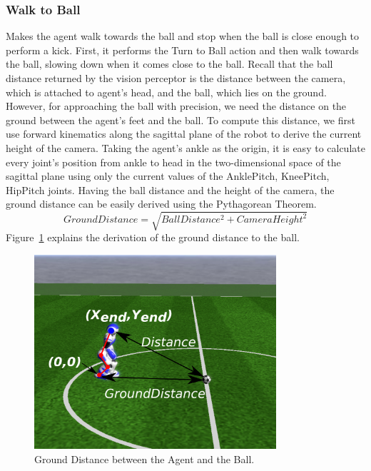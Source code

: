 \subsubsection*{Walk to Ball}
Makes the agent walk towards the ball and stop when the ball is close enough to perform a kick. First, it performs the Turn to Ball action and then walk towards the ball, slowing down when it comes close to the ball. Recall that the ball distance returned by the vision perceptor is the distance between the camera, which is attached to agent's head, and the ball, which lies on the ground. However, for approaching the ball with precision, we need the distance on the ground between the agent's feet and the ball. To compute this distance, we first use forward kinematics along the sagittal plane of the robot to derive the current height of the camera. Taking the agent's ankle as the origin, it is easy to calculate every joint's position from ankle to head in the two-dimensional space of the sagittal plane using only the current values of the AnklePitch, KneePitch, HipPitch joints. Having the ball distance and the height of the camera, the ground distance can be easily derived using the Pythagorean Theorem. 
\[
GroundDistance = \sqrt{BallDistance^2 + CameraHeight^2}
\]
Figure~\ref{fig:2dkinematics} explains the derivation of the ground distance to the ball.
 
 \begin{figure}[t!]
\centering
  \includegraphics[trim=0cm 4cm 3cm 4cm,clip,width=0.8\textwidth]   {Chapter3/figures/2dkinematics.pdf}
  \caption{Ground Distance between the Agent and the Ball.}
  \label{fig:2dkinematics}
\end{figure}


